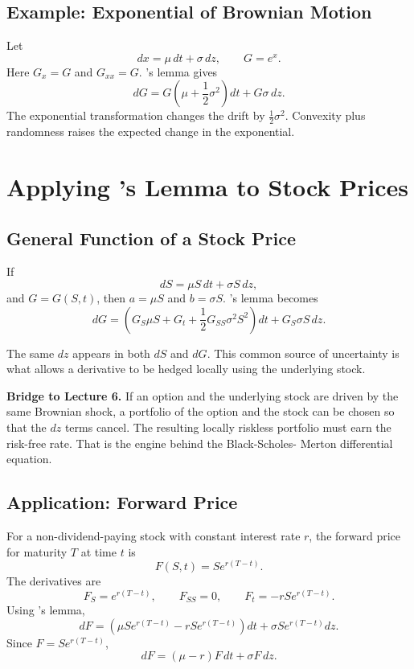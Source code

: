 \subsection{Example: Exponential of Brownian Motion}

Let
\[
    dx=\mu\,dt+\sigma\,dz,
    \qquad
    G=e^x.
\]
Here $G_x=G$ and $G_{xx}=G$. \Ito's lemma gives
\[
    dG
    =
    G\left(\mu+\frac{1}{2}\sigma^2\right)dt
    +
    G\sigma\,dz.
\]
The exponential transformation changes the drift by
$\frac{1}{2}\sigma^2$. Convexity plus randomness raises the expected change in
the exponential.

\section{Applying \Ito's Lemma to Stock Prices}

\subsection{General Function of a Stock Price}

If
\[
    dS=\mu S\,dt+\sigma S\,dz,
\]
and $G=G(S,t)$, then $a=\mu S$ and $b=\sigma S$. \Ito's lemma becomes
\[
    dG
    =
    \left(
        G_S\mu S+G_t+\frac{1}{2}G_{SS}\sigma^2S^2
    \right)dt
    +
    G_S\sigma S\,dz.
\]

The same $dz$ appears in both $dS$ and $dG$. This common source of uncertainty
is what allows a derivative to be hedged locally using the underlying stock.

\begin{boxF}
\textbf{Bridge to Lecture 6.} If an option and the underlying stock are driven
by the same Brownian shock, a portfolio of the option and the stock can be
chosen so that the $dz$ terms cancel. The resulting locally riskless portfolio
must earn the risk-free rate. That is the engine behind the Black-Scholes-
Merton differential equation.
\end{boxF}

\subsection{Application: Forward Price}

For a non-dividend-paying stock with constant interest rate $r$, the forward
price for maturity $T$ at time $t$ is
\[
    F(S,t)=S e^{r(T-t)}.
\]
The derivatives are
\[
    F_S=e^{r(T-t)},
    \qquad
    F_{SS}=0,
    \qquad
    F_t=-rS e^{r(T-t)}.
\]
Using \Ito's lemma,
\[
    dF
    =
    \left(\mu S e^{r(T-t)}-rS e^{r(T-t)}\right)dt
    +
    \sigma S e^{r(T-t)}dz.
\]
Since $F=S e^{r(T-t)}$,
\[
    dF=(\mu-r)F\,dt+\sigma F\,dz.
\]

